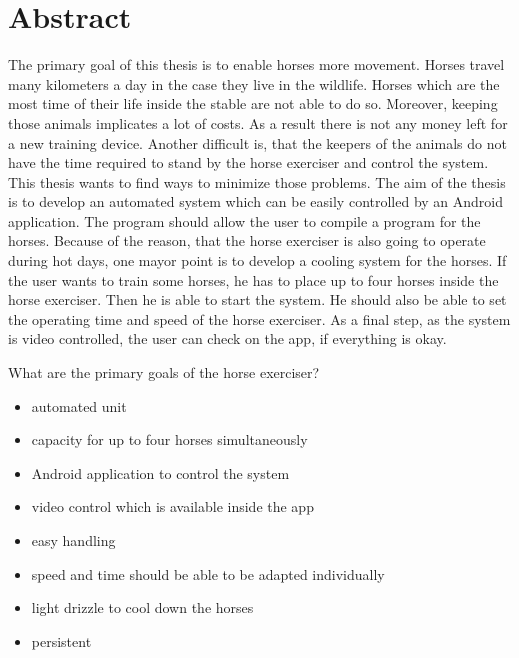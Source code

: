 \newpage

\section*{Abstract}
\label{sec:abstractIntroduction}

The primary goal of this thesis is to enable horses more movement. Horses travel many kilometers a day in the case they live in the wildlife. Horses which are the most time of their life inside the stable are not able to do so. Moreover, keeping those animals implicates a lot of costs. As a result there is not any money left for a new training device. Another difficult is, that the keepers of the animals do not have the time required to stand by the horse exerciser and control the system. \\

This thesis wants to find ways to minimize those problems. The aim of the thesis is to develop an automated system which can be easily controlled by an Android application. The program should allow the user to compile a program for the horses. Because of the reason, that the horse exerciser is also going to operate during hot days, one mayor point is to develop a cooling system for the horses. If the user wants to train some horses, he has to place up to four horses inside the horse exerciser. Then he is able to start the system. He should also be able to set the operating time and speed of the horse exerciser. As a final step, as the system is video controlled, the user can check on the app, if everything is okay. \newline{}

What are the primary goals of the horse exerciser?\\

\begin{itemize}
	\item{automated unit}
	\item{capacity for up to four horses simultaneously}
	\item{Android application to control the system}
	\item{video control which is available inside the app}
	\item{easy handling}
	\item{speed and time should be able to be adapted individually}
	\item{light drizzle to cool down the horses}
	\item{persistent}
\end{itemize} 


